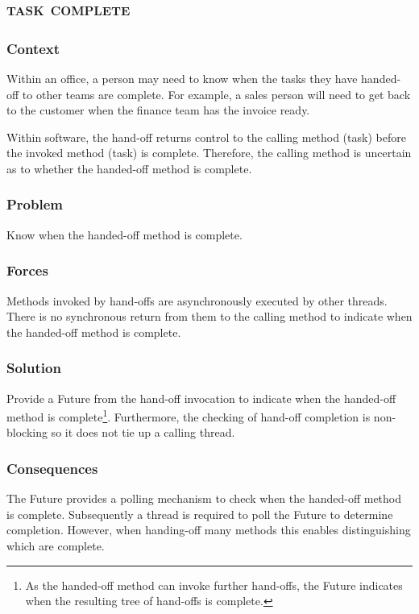\documentclass[prodmode]{style/acmlarge}
\begin{document}
\subsection{\textsc{\textbf{task complete}}}

\subsubsection*{Context} Within an office, a person may need to know when the
tasks they have handed-off to other teams are complete.  For example, a sales
person will need to get back to the customer when the finance team has the
invoice ready.

Within software, the hand-off returns control to the calling method (task)
before the invoked method (task) is complete.  Therefore, the calling method is
uncertain as to whether the handed-off method is complete.

\subsubsection*{\textbf{Problem}} Know when the handed-off method is complete.

\subsubsection*{Forces} Methods invoked by hand-offs are asynchronously executed
by other threads.  There is no synchronous return from them to the calling
method to indicate when the handed-off method is complete.

\subsubsection*{\textbf{Solution}} Provide a Future \cite{concurrent-java} from
the hand-off invocation to indicate when the handed-off method is
complete\footnote{As the handed-off method can invoke further hand-offs, the
Future indicates when the resulting tree of hand-offs is complete.}. 
Furthermore, the checking of hand-off completion is non-blocking so it does not
tie up a calling thread.

\subsubsection*{Consequences} The Future provides a polling mechanism to check
when the handed-off method is complete.  Subsequently a thread is required to
poll the Future to determine completion.  However, when handing-off many methods
this enables distinguishing which are complete.
\end{document}
